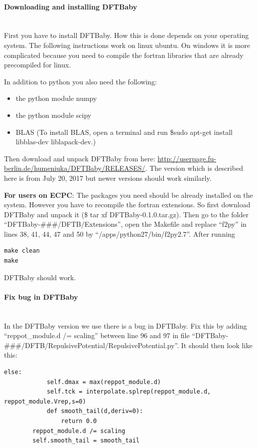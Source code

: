 \documentclass[10pt,a4paper]{article} %
\begin{document}
\paragraph{Downloading and installing DFTBaby}\mbox{}\\

First you have to install DFTBaby. How this is done depends on your operating system. The following instructions work on linux ubuntu. On windows it is more complicated because you need to compile the fortran libraries that are already precompiled for linux.

In addition to python you also need the following:
\begin{itemize}
\item the python module numpy
\item the python module scipy
\item BLAS (To install BLAS, open a terminal and run \$sudo apt-get install libblas-dev liblapack-dev.)
\end{itemize}

Then download and unpack DFTBaby from here: \url{http://userpage.fu-berlin.de/humeniuka/DFTBaby/RELEASES/}. The version which is described here is from July 20, 2017 but newer versions should work similarly.

\textbf{For users on ECPC}: The packages you need should be already installed on the system. However you have to recompile the fortran extensions. So first download DFTBaby and unpack it (\$ tar xf DFTBaby-0.1.0.tar.gz). Then go to the folder ``DFTBaby-\#\#\#/DFTB/Extensions'', open the Makefile and replace ``f2py'' in lines 38, 41, 44, 47 and 50 by ``/apps/python27/bin/f2py2.7''. After running
\begin{lstlisting}
make clean
make
\end{lstlisting}
DFTBaby should work.

\paragraph{Fix bug in DFTBaby}\mbox{}\\

In the DFTBaby version we use there is a bug in DFTBaby. Fix this by adding ``reppot\_module.d /= scaling'' between line 96 and 97 in file ``DFTBaby-\#\#\#/DFTB/RepulsivePotential/RepulsivePotential.py''. It should then look like this:
\begin{lstlisting}[firstnumber=92]
        else:
            self.dmax = max(reppot_module.d)
            self.tck = interpolate.splrep(reppot_module.d, reppot_module.Vrep,s=0)
            def smooth_tail(d,deriv=0):
                return 0.0
        reppot_module.d /= scaling
        self.smooth_tail = smooth_tail
\end{lstlisting}
\end{document}
